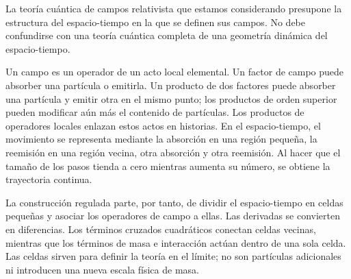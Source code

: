 La teoría cuántica de campos relativista que estamos considerando presupone la estructura del espacio-tiempo en la que se definen sus campos. No debe confundirse con una teoría cuántica completa de una geometría dinámica del espacio-tiempo.

\begin{classroomqa}
\end{classroomqa}

Un campo es un operador de un acto local elemental. Un factor de campo puede absorber una partícula o emitirla. Un producto de dos factores puede absorber una partícula y emitir otra en el mismo punto; los productos de orden superior pueden modificar aún más el contenido de partículas. Los productos de operadores locales enlazan estos actos en historias. En el espacio-tiempo, el movimiento se representa mediante la absorción en una región pequeña, la reemisión en una región vecina, otra absorción y otra reemisión. Al hacer que el tamaño de los pasos tienda a cero mientras aumenta su número, se obtiene la trayectoria continua.

\begin{classroomqa}
\end{classroomqa}

La construcción regulada parte, por tanto, de dividir el espacio-tiempo en celdas pequeñas y asociar los operadores de campo a ellas. Las derivadas se convierten en diferencias. Los términos cruzados cuadráticos conectan celdas vecinas, mientras que los términos de masa e interacción actúan dentro de una sola celda. Las celdas sirven para definir la teoría en el límite; no son partículas adicionales ni introducen una nueva escala física de masa.

